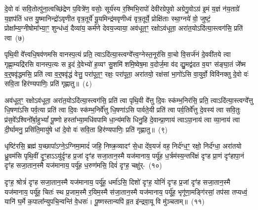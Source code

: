{\anuvakamend[{मा त्वा॒ षट्च॑त्वारिꣳशच्च}]}

दे॒वो वः॑ सवि॒तोत्पु॑ना॒त्वच्छि॑द्रेण प॒वित्रे॑ण॒ वसोः॒ सूर्य॑स्य र॒श्मिभि॒रापो॑ देवीरग्रेपुवो अग्रेगु॒वो\-ऽग्र॑ इ॒मं य॒ज्ञं न॑य॒ताग्रे॑ य॒ज्ञप॑तिं धत्त यु॒ष्मानिन्द्रो॑\-ऽवृणीत वृत्र॒तूर्ये॑ यू॒यमिन्द्र॑मवृणीध्वं वृत्र॒तूर्ये॒ प्रोक्षि॑ताः स्था॒ग्नये॑ वो॒ जुष्टं॒ प्रोक्षा᳚म्य॒ग्नी\-षोमा᳚भ्या॒ꣳ॒ शुन्ध॑ध्वं॒ दैव्या॑य॒ कर्म॑णे देवय॒ज्याया॒ अव॑धूत॒ꣳ॒ रक्षो\-ऽव॑धूता॒ अरा॑त॒यो\-ऽदि॑त्या॒स्त्वग॑सि॒ प्रति॑ त्वा~(७)\ip

पृथि॒वी वे᳚त्त्वधि॒षव॑णमसि वानस्प॒त्यं प्रति॒ त्वा\-ऽदि॑त्या॒स्त्वग्वे᳚त्त्व॒ग्नेस्त॒नूर॑सि वा॒चो वि॒सर्ज॑नं दे॒ववी॑तये त्वा गृह्णा॒म्यद्रि॑रसि वानस्प॒त्यः स इ॒दं दे॒वेभ्यो॑ ह॒व्यꣳ सु॒शमि॑ शमि॒ष्वेष॒मा व॒दोर्ज॒मा व॑द द्यु॒मद्व॑दत व॒यꣳ स॑ङ्घा॒तं जे᳚ष्म व॒र्॒षवृ॑द्धमसि॒ प्रति॑ त्वा व॒र्॒षवृ॑द्धं वेत्तु॒ परा॑पूत॒ꣳ॒ रक्षः॒ परा॑पूता॒ अरा॑तयो॒ रक्ष॑सां भा॒गो॑\-ऽसि वा॒युर्वो॒ विवि॑नक्तु दे॒वो वः॑ सवि॒ता हिर॑ण्यपाणिः॒ प्रति॑ गृह्णातु॥~(८)\ip

{\anuvakamend[{त्वा॒ भा॒ग एका॑\-दश च}]}

अव॑धूत॒ꣳ॒ रक्षो\-ऽव॑धूता॒ अरा॑त॒यो\-ऽदि॑त्या॒स्त्वग॑सि॒ प्रति॑ त्वा पृथि॒वी वे᳚त्तु दि॒वः स्क॑म्भ॒निर॑सि॒ प्रति॒ त्वा\-ऽदि॑त्या॒स्त्वग्वे᳚त्तु धि॒षणा॑\-ऽसि पर्व॒त्या प्रति॑ त्वा दि॒वः स्क॑म्भ॒निर्वे᳚त्तु धि॒षणा॑\-ऽसि पार्वते॒यी प्रति॑ त्वा पर्व॒तिर्वे᳚त्तु दे॒वस्य॑ त्वा सवि॒तुः प्र॑स॒वे᳚\-ऽश्विनो᳚र्बा॒हु\-भ्यां᳚ पू॒ष्णो हस्ता᳚भ्या॒मधि॑वपामि धा॒न्य॑मसि धिनु॒हि दे॒वान्प्रा॒णाय॑ त्वा\-ऽपा॒नाय॑ त्वा व्या॒नाय॑ त्वा दी॒र्घामनु॒ प्रसि॑ति॒मायु॑षे धां दे॒वो वः॑ सवि॒ता हिर॑ण्यपाणिः॒ प्रति॑ गृह्णातु॥~(९)\ip

{\anuvakamend[{प्रा॒णाय॑ त्वा॒ पञ्च॑दश च}]}

धृष्टि॑रसि॒ ब्रह्म॑ य॒च्छापा᳚\-ऽग्ने॒\-ऽग्निमा॒मादं॑ जहि॒ निष्क्र॒व्यादꣳ॑ से॒धा दे॑व॒यजं॑ वह॒ निर्द॑ग्ध॒ꣳ॒ रक्षो॒ निर्द॑ग्धा॒ अरा॑तयो ध्रु॒वम॑सि पृथि॒वीं दृ॒ꣳ॒हा\-ऽऽ\-यु॑र्दृꣳह प्र॒जां दृꣳ॑ह सजा॒तान॒स्मै यज॑मानाय॒ पर्यू॑ह ध॒र्त्रम॑स्य॒न्तरि॑क्षं दृꣳह प्रा॒णं दृꣳ॑हापा॒नं दृꣳ॑ह सजा॒ता\-न॒स्मै यज॑मानाय॒ पर्यू॑ह ध॒रुण॑मसि॒ दिवं॑ दृꣳह॒ चक्षु॑र्-~(१०)\ip

दृꣳह॒ श्रोत्रं॑ दृꣳह सजा॒तान॒स्मै यज॑मानाय॒ पर्यू॑ह॒ धर्मा॑\-ऽसि॒ दिशो॑ दृꣳह॒ योनिं॑ दृꣳह प्र॒जां दृꣳ॑ह सजा॒तान॒स्मै यज॑मानाय॒ पर्यू॑ह॒ चितः॑ स्थ प्र॒जाम॒स्मै र॒यिम॒स्मै स॑जा॒तान॒स्मै यज॑मानाय॒ पर्यू॑ह॒ भृगू॑णा॒मङ्गि॑रसां॒ तप॑सा तप्यध्वं॒ यानि॑ घ॒र्मे क॒पाला᳚न्युपचि॒न्वन्ति॑ वे॒धसः॑। पू॒ष्णस्तान्यपि॑ व्र॒त इ॑न्द्रवा॒यू वि मु॑ञ्चताम्॥~(११)\ip

{\anuvakamend[{चक्षु॑र॒ष्टाच॑त्वारिꣳशच्च}]}


